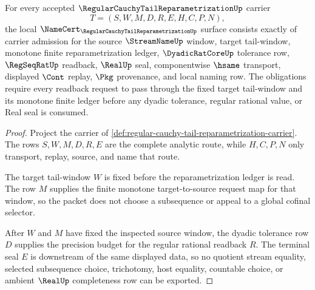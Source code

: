 \begin{theorem}
\label{thm:regular-cauchy-tail-reparametrization-namecert-obligations}
For every accepted $\RegularCauchyTailReparametrizationUp$ carrier
$$
T=(S,W,M,D,R,E,H,C,P,N),
$$
the local $\NameCert_{\RegularCauchyTailReparametrizationUp}$ surface consists exactly of carrier admission for the source $\StreamNameUp$ window, target tail-window, monotone finite reparametrization ledger, $\DyadicRatCoreUp$ tolerance row, $\RegSeqRatUp$ readback, $\RealUp$ seal, componentwise $\hsame$ transport, displayed $\Cont$ replay, $\Pkg$ provenance, and local naming row. The obligations require every readback request to pass through the fixed target tail-window and its monotone finite ledger before any dyadic tolerance, regular rational value, or Real seal is consumed.
\end{theorem}
\begin{proof}
Project the carrier of \autoref{def:regular-cauchy-tail-reparametrization-carrier}. The rows $S,W,M,D,R,E$ are the complete analytic route, while $H,C,P,N$ only transport, replay, source, and name that route.

The target tail-window $W$ is fixed before the reparametrization ledger is read. The row $M$ supplies the finite monotone target-to-source request map for that window, so the packet does not choose a subsequence or appeal to a global cofinal selector.

After $W$ and $M$ have fixed the inspected source window, the dyadic tolerance row $D$ supplies the precision budget for the regular rational readback $R$. The terminal seal $E$ is downstream of the same displayed data, so no quotient stream equality, selected subsequence choice, trichotomy, host equality, countable choice, or ambient $\RealUp$ completeness row can be exported.
\end{proof}

